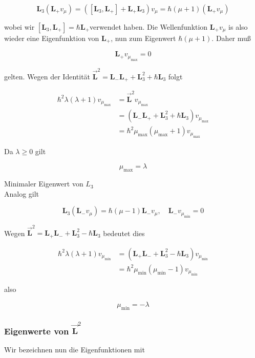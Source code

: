 \documentclass[10pt, letterpaper]{article}
\begin{document}
$$
\mathbf{L}_{3}\left(\mathbf{L}_{+} v_{\mu}\right)=\left(\left[\mathbf{L}_{3}, \mathbf{L}_{+}\right]+\mathbf{L}_{+} \mathbf{L}_{3}\right) v_{\mu}=\hbar(\mu+1)\left(\mathbf{L}_{+} v_{\mu}\right)
$$

wobei wir $\left[\mathbf{L}_{3}, \mathbf{L}_{+}\right]=\hbar \mathbf{L}_{+}$verwendet haben. Die Wellenfunktion $\mathbf{L}_{+} v_{\mu}$ is also wieder eine Eigenfunktion von $\mathbf{L}_{+}$, nun zum Eigenwert $\hbar(\mu+1)$. Daher muß

$$
\mathbf{L}_{+} v_{\mu_{\max }}=0
$$

gelten. Wegen der Identität $\overrightarrow{\mathbf{L}}^{2}=\mathbf{L}_{-} \mathbf{L}_{+}+\mathbf{L}_{3}^{2}+\hbar \mathbf{L}_{3}$ folgt

$$
\begin{aligned}
\hbar^{2} \lambda(\lambda+1) v_{\mu_{\max }} & =\overrightarrow{\mathbf{L}}^{2} v_{\mu_{\max }} \\
& =\left(\mathbf{L}_{-} \mathbf{L}_{+}+\mathbf{L}_{3}^{2}+\hbar \mathbf{L}_{3}\right) v_{\mu_{\max }} \\
& =\hbar^{2} \mu_{\max }\left(\mu_{\max }+1\right) v_{\mu_{\max }}
\end{aligned}
$$

Da $\lambda \geq 0$ gilt

$$
\mu_{\max }=\lambda
$$

Minimaler Eigenwert von $L_{3}$\\
Analog gilt

$$
\mathbf{L}_{3}\left(\mathbf{L}_{-} v_{\mu}\right)=\hbar(\mu-1) \mathbf{L}_{-} v_{\mu}, \quad \mathbf{L}_{-} v_{\mu_{\min }}=0
$$

Wegen $\overrightarrow{\mathbf{L}}^{2}=\mathbf{L}_{+} \mathbf{L}_{-}+\mathbf{L}_{3}^{2}-\hbar \mathbf{L}_{3}$ bedeutet dies

$$
\begin{aligned}
\hbar^{2} \lambda(\lambda+1) v_{\mu_{\min }} & =\left(\mathbf{L}_{+} \mathbf{L}_{-}+\mathbf{L}_{3}^{2}-\hbar \mathbf{L}_{3}\right) v_{\mu_{\min }} \\
& =\hbar^{2} \mu_{\min }\left(\mu_{\min }-1\right) v_{\mu_{\min }}
\end{aligned}
$$

also

$$
\mu_{\min }=-\lambda
$$

\subsubsection*{Eigenwerte von $\overrightarrow{\mathbf{L}}^{2}$}
Wir bezeichnen nun die Eigenfunktionen mit
\end{document}
